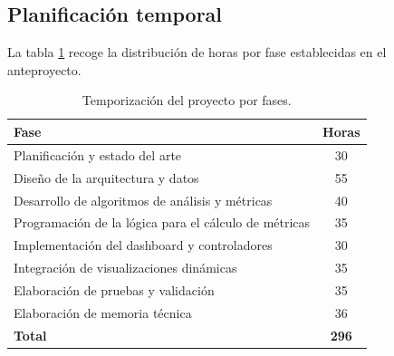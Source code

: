 \documentclass[12pt,a4paper,twoside,openright]{book}
\begin{document}
\subsection{Planificación temporal}
\noindent La tabla \ref{tab:temporalizacion} recoge la distribución de horas por fase establecidas en el anteproyecto.
\begin{table}[ht]
  \centering
  \caption{Temporización del proyecto por fases.}
  \label{tab:temporalizacion}
  \small
  \begin{tabularx}{\textwidth}{X c}
    \toprule
    \textbf{Fase} & \textbf{Horas} \\
    \midrule
    Planificación y estado del arte                          & 30 \\
    Diseño de la arquitectura y datos                        & 55 \\
    Desarrollo de algoritmos de análisis y métricas          & 40 \\
    Programación de la lógica para el cálculo de métricas   & 35 \\
    Implementación del dashboard y controladores             & 30 \\
    Integración de visualizaciones dinámicas                 & 35 \\
    Elaboración de pruebas y validación                      & 35 \\
    Elaboración de memoria técnica                           & 36 \\
    \midrule
    \textbf{Total}                                           & \textbf{296} \\
    \bottomrule
  \end{tabularx}
\end{table}
\end{document}
